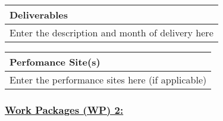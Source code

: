 \documentclass[a4paper,11pt]{nprp}
\begin{document}
\begin{center}
\vspace{1em}

\begin{tabular}{|p{1\realwidth}|}
\hline
\textbf{Deliverables} \\
\hline
Enter the description and month of delivery here \\
\hline
\end{tabular}

\vspace{1em}

\begin{tabular}{|p{1\realwidth}|}
\hline
\textbf{Perfomance Site(s)} \\
\hline
Enter the performance sites here (if applicable) \\
\hline
\end{tabular}

\end{center}


\subsubsection{\underline{Work Packages (WP) 2:}}
\end{document}
